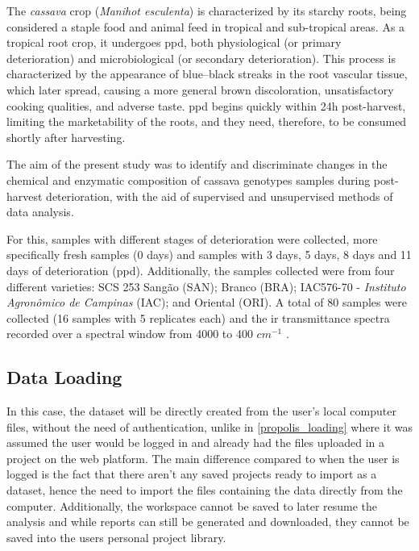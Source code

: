 The \textit{cassava} crop (\textit{Manihot esculenta}) is characterized by its starchy roots, being considered a staple food and animal feed in tropical and sub-tropical areas. As a tropical root crop, it undergoes \acrfull{ppd}, both physiological (or primary deterioration) and microbiological (or secondary deterioration). This process is characterized by the appearance of blue–black streaks in the root vascular tissue, which later spread, causing a more general brown discoloration, unsatisfactory cooking qualities, and adverse taste. \gls{ppd} begins quickly within 24h post-harvest, limiting the marketability of the roots, and they need, therefore, to be consumed shortly after harvesting.

The aim of the present study was to identify and discriminate changes in the chemical and enzymatic composition of cassava genotypes samples during post-harvest deterioration, with the aid of supervised and unsupervised methods of data analysis.

For this, samples with different stages of deterioration were collected, more specifically fresh samples (0 days) and samples with 3 days, 5 days, 8 days and 11 days of deterioration (\gls{ppd}). Additionally, the samples collected were from four different varieties: SCS 253 Sangão (SAN); Branco (BRA); IAC576-70 - \textit{Instituto Agronômico de Campinas} (IAC); and Oriental (ORI). A total of 80 samples were collected (16 samples with 5 replicates each) and the \gls{ir} transmittance spectra recorded over a spectral window from 4000 to 400 $cm^{-1}$ \citep{uarrota2014metabolomics}.


\subsection{Data Loading}

In this case, the dataset will be directly created from the user's local computer files, without the need of authentication, unlike in \autoref{propolis_loading} where it was assumed the user would be logged in and already had the files uploaded in a project on the web platform. The main difference compared to when the user is logged is the fact that there aren't any saved projects ready to import as a dataset, hence the need to import the files containing the data directly from the computer. Additionally, the workspace cannot be saved to later resume the analysis and while reports can still be generated and downloaded, they cannot be saved into the users personal project library. 

